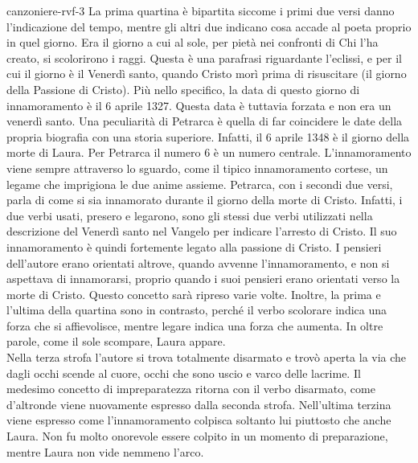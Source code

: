 \documentclass[preview]{standalone}
\begin{document}
\begin{snippet}{canzoniere-rvf-3}
    La prima quartina è bipartita siccome i primi due versi danno l'indicazione del tempo,
    mentre gli altri due indicano cosa accade al poeta proprio in quel giorno.
    Era il giorno a cui al sole, per pietà nei confronti di Chi l'ha creato, si scolorirono i raggi.
    Questa è una parafrasi riguardante l'eclissi, e per il cui il giorno è il Venerdì santo, quando
    Cristo morì prima di risuscitare (il giorno della Passione di Cristo).
    Più nello specifico, la data di questo giorno di innamoramento è il 6 aprile 1327.
    Questa data è tuttavia forzata e non era un venerdì santo.
    Una peculiarità di Petrarca è quella di far coincidere le date della propria biografia
    con una storia superiore. Infatti, il 6 aprile 1348 è il giorno della morte di Laura.
    Per Petrarca il numero 6 è un numero centrale.
    L'innamoramento viene sempre attraverso lo sguardo, come il tipico innamoramento cortese,
    un legame che imprigiona le due anime assieme.
    Petrarca, con i secondi due versi, parla di come si sia innamorato durante il giorno della morte di Cristo.
    Infatti, i due verbi usati, presero e legarono, sono gli stessi due verbi utilizzati nella descrizione
    del Venerdì santo nel Vangelo per indicare l'arresto di Cristo.
    Il suo innamoramento è quindi fortemente legato alla passione di Cristo.
    I pensieri dell'autore erano orientati altrove, quando avvenne l'innamoramento, e non si aspettava
    di innamorarsi, proprio quando i suoi pensieri erano orientati verso la morte di Cristo.
    Questo concetto sarà ripreso varie volte.
    Inoltre, la prima e l'ultima della quartina sono in contrasto, perché il verbo scolorare
    indica una forza che si affievolisce, mentre legare indica una forza che aumenta.
    In oltre parole, come il sole scompare, Laura appare. \\
    Nella terza strofa l'autore si trova totalmente disarmato e trovò aperta la via
    che dagli occhi scende al cuore, occhi che sono uscio e varco delle lacrime.
    Il medesimo concetto di impreparatezza ritorna con il verbo disarmato, come d'altronde viene
    nuovamente espresso dalla seconda strofa.
    Nell'ultima terzina viene espresso come
    l'innamoramento colpisca soltanto lui piuttosto che anche Laura.
    Non fu molto onorevole essere colpito in un momento di preparazione, mentre
    Laura non vide nemmeno l'arco.

\end{snippet}
\end{document}
